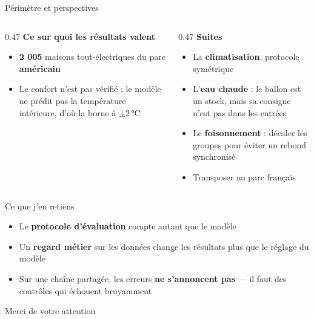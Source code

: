 \begin{frame}{Périmètre et perspectives}
\begin{columns}[T]
\begin{column}{0.47\textwidth}
\textbf{Ce sur quoi les résultats valent}
\vspace{0.6em}
\begin{itemize}\setlength{\itemsep}{0.6em}
  \item \textbf{2 005} maisons tout-électriques du parc \textbf{américain}
  \item Le confort n'est pas vérifié : le modèle ne prédit pas la température
  intérieure, d'où la borne à $\pm 2$\,°C
\end{itemize}
\end{column}
\begin{column}{0.47\textwidth}
\textbf{Suites}
\vspace{0.6em}
\begin{itemize}\setlength{\itemsep}{0.6em}
  \item La \textbf{climatisation}, protocole symétrique
  \item L'\textbf{eau chaude} : le ballon est un stock, mais sa consigne n'est
  pas dans les entrées
  \item Le \textbf{foisonnement} : décaler les groupes pour éviter un rebond
  synchronisé
  \item Transposer au parc français
\end{itemize}
\end{column}
\end{columns}
\end{frame}

\begin{frame}{Ce que j'en retiens}
\vspace{1em}
\begin{itemize}\setlength{\itemsep}{1.1em}
  \item Le \textbf{protocole d'évaluation} compte autant que le modèle
  \item Un \textbf{regard métier} sur les données change les résultats plus que
  le réglage du modèle
  \item Sur une chaîne partagée, les erreurs \textbf{ne s'annoncent pas} --- il
  faut des contrôles qui échouent bruyamment
\end{itemize}

\vspace{2em}
\begin{center}
{\Large\color{BleuFonce} Merci de votre attention}
\end{center}
\end{frame}

